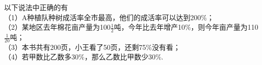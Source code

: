 以下说法中正确的有\key{\hspace{1cm}} \\

（1）A种植队种树成活率全市最高，他们的成活率可以达到200$\%$；\\

（2）某地区去年棉花亩产量为100$\frac{1}{2}$吨，今年比去年增产10$\%$，则今年亩产量为110$\frac{1}{20}$吨；\\

（3）本书共有200页，小王看了50页，还剩75$\%$没有看；\\

（4）若甲数比乙数多30$\%$，那么乙数比甲数少30$\%$.




